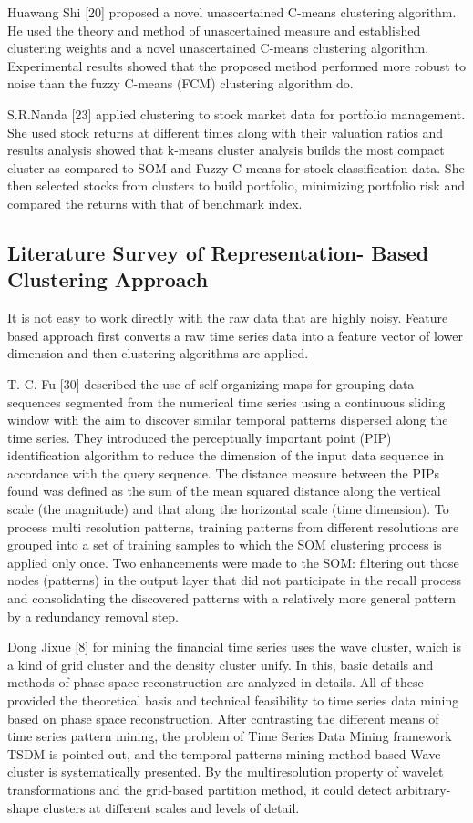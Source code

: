 Huawang Shi [20] proposed a novel unascertained C-means clustering algorithm. He used the theory and method of unascertained measure and established clustering weights and a novel unascertained C-means clustering algorithm. Experimental results showed that the proposed method performed  more  robust  to  noise  than  the  fuzzy  C-means (FCM) clustering algorithm do.

S.R.Nanda [23] applied clustering to stock market data for portfolio  management.  She  used  stock  returns  at  different times along with their valuation ratios and results analysis showed that k-means cluster analysis builds the most compact cluster as compared to SOM and Fuzzy C-means for stock classification data. She then selected stocks from clusters to build portfolio, minimizing portfolio risk and compared the returns with that of benchmark index.
 
\subsection{ Literature Survey of Representation- Based Clustering Approach}
It is not easy to work directly with the raw data that are highly noisy. Feature based approach first converts a raw time series data  into  a  feature  vector  of  lower  dimension  and  then
clustering algorithms are applied.

T.-C. Fu [30] described the use of self-organizing maps for grouping data sequences segmented from the numerical time series  using  a  continuous  sliding  window  with  the  aim to discover similar temporal patterns dispersed along the time series. They introduced the perceptually important point (PIP) identification algorithm to reduce the dimension of the input data sequence in accordance with the query sequence. The distance measure between the PIPs found was defined as the sum of the mean squared distance along the vertical scale (the magnitude) and that along the horizontal scale (time dimension). To process multi resolution patterns, training patterns from different resolutions are grouped into a set of training samples to which the SOM clustering process is applied  only  once.  Two  enhancements  were  made  to  the SOM: filtering out those nodes (patterns) in the output layer that did not participate in the recall process and consolidating the discovered patterns with a relatively more general pattern by a redundancy removal step.

Dong Jixue [8] for mining the financial time series uses the wave cluster, which is a kind of grid cluster and the density cluster unify. In this, basic details and methods of phase space reconstruction are analyzed in details. All of these provided the theoretical basis and technical feasibility to time series data mining based on phase space reconstruction. After contrasting the different means of time series pattern mining, the problem of Time Series Data Mining framework TSDM is pointed out, and the temporal patterns mining method based Wave cluster is systematically presented. By the multiresolution property of wavelet transformations and the grid-based  partition  method, it could  detect arbitrary-shape clusters at different scales and levels of detail.

